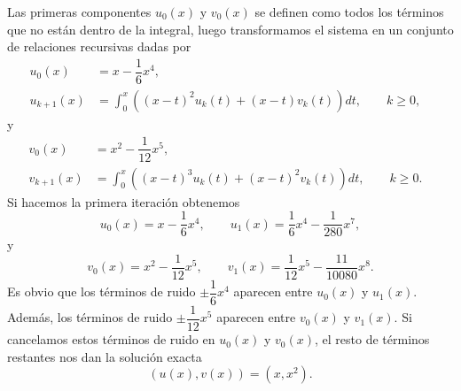 \begin{ejemplo}
	Las primeras componentes $u_0(x)$ y $v_0(x)$ se definen como todos los términos que no están dentro de la integral, luego transformamos el sistema en un conjunto de relaciones recursivas dadas por
	\begin{align}
		u_0(x) &= x - \dfrac{1}{6}x^4,      &   \\
		u_{k+1}(x) &= \int_{0}^{x} ((x-t)^2u_k(t) + (x-t)v_k(t))dt, \qquad k \geqslant0 ,   &
	\end{align}
	y
	\begin{align}
		v_0(x) &= x^2 - \dfrac{1}{12}x^5,      &   \\
		v_{k+1}(x) &= \int_{0}^{x} ((x-t)^3u_k(t) + (x-t)^2v_k(t))dt, \qquad k \geqslant0 .   &
	\end{align}
	Si hacemos la primera iteración obtenemos
	\begin{equation}
		u_0(x) = x - \dfrac{1}{6}x^4, \qquad u_1(x) = \dfrac{1}{6}x^4 - \dfrac{1}{280}x^7,
	\end{equation}
	y
	\begin{equation}
		v_0(x) = x^2 - \dfrac{1}{12}x^5, \qquad v_1(x) = \dfrac{1}{12}x^5 - \dfrac{11}{10080}x^8.
	\end{equation}
	Es obvio que los términos de ruido $\pm \dfrac{1}{6}x^4$ aparecen entre $u_0(x)$ y $u_1(x)$. Además, los términos de ruido $\pm \dfrac{1}{12}x^5$ aparecen entre $v_0(x)$ y $v_1(x)$. Si cancelamos estos términos de ruido en $u_0(x)$ y $v_0(x)$, el resto de términos restantes nos dan la solución exacta
	\begin{equation}
		(u(x), v(x)) = (x,x^2).
	\end{equation}
\end{ejemplo}

